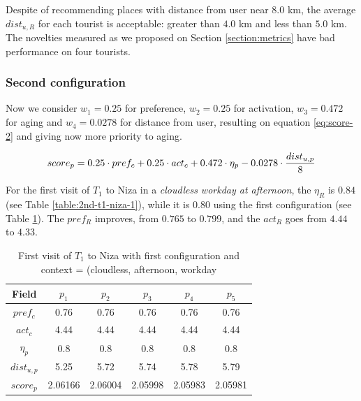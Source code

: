Despite of recommending places with distance from user near $8.0$ km, the average $dist_{u,R}$ for each tourist is acceptable: greater than $4.0$ km and less than $5.0$ km. The novelties measured as we proposed on Section \ref{section:metrics} have bad performance on four tourists.

\vspace{-0.1cm}
\subsubsection{Second configuration} \label{section:experiment-2}
Now we consider $w_1 = 0.25$ for preference, $w_2 = 0.25$ for activation, $w_3 = 0.472$ for aging and $w_4 = 0.0278$ for distance from user, resulting on equation \ref{eq:score-2} and giving now more priority to aging.

\vspace{-0.2cm}
\begin{equation} \label{eq:score-2}
    \footnotesize{
        score_p =  0.25 \cdot pref_c + 0.25 \cdot act_c 
                                        + 0.472 \cdot \eta_p - 0.0278 \cdot \frac{dist_{u,p}}{8}
    }
\end{equation}

For the first visit of $T_1$ to Niza in a {\it cloudless workday at afternoon}, the $\eta_R$ is $0.84$
(see Table \ref{table:2nd-t1-niza-1}), while it is $0.80$ using the first configuration (see Table \ref{table:1st-t1-niza-1}). The $pref_R$ improves, from $0.765$ to $0.799$, and the $act_R$ goes from $4.44$ to $4.33$.

\begin{table}[h!]
\vspace{-0.1cm}
\footnotesize{
    \centering
        \caption{First visit of $T_1$ to Niza with first configuration and context = (cloudless, afternoon, workday}
    \label{table:1st-t1-niza-1}
    \vspace{-0.3cm}
    \begin{tabular}{ |c|c|c|c|c|c| } 
        \hline
        Field   & $p_1$ & $p_2$ & $p_3$ & $p_4$ & $p_5$ \\
        \hline
        $pref_c$    &  0.76 & 0.76 & 0.76 & 0.76 & 0.76 \\
        $act_c$     & 4.44 & 4.44 & 4.44 & 4.44 & 4.44  \\
        $\eta_p$    & 0.8 & 0.8 & 0.8 & 0.8 & 0.8 \\
        $dist_{u,p}$ & 5.25 & 5.72 & 5.74 & 5.78 & 5.79 \\
        $score_p$    & 2.06166 & 2.06004 & 2.05998 & 2.05983 & 2.05981 \\
        
        \hline
    \end{tabular}
    }
    \vspace{-0.3cm}
\end{table}

